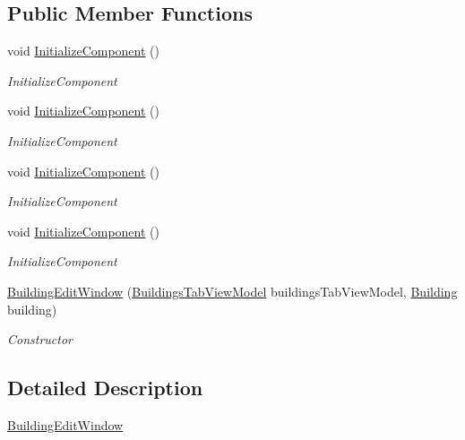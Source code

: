 \subsection*{Public Member Functions}
\begin{DoxyCompactItemize}
\item 
void \hyperlink{class_baudi_1_1_client_1_1_view_1_1_edit_windows_1_1_building_edit_window_a2564e64d22b3990aad94b38d5792df70}{Initialize\+Component} ()
\begin{DoxyCompactList}\small\item\em Initialize\+Component \end{DoxyCompactList}\item 
void \hyperlink{class_baudi_1_1_client_1_1_view_1_1_edit_windows_1_1_building_edit_window_a2564e64d22b3990aad94b38d5792df70}{Initialize\+Component} ()
\begin{DoxyCompactList}\small\item\em Initialize\+Component \end{DoxyCompactList}\item 
void \hyperlink{class_baudi_1_1_client_1_1_view_1_1_edit_windows_1_1_building_edit_window_a2564e64d22b3990aad94b38d5792df70}{Initialize\+Component} ()
\begin{DoxyCompactList}\small\item\em Initialize\+Component \end{DoxyCompactList}\item 
void \hyperlink{class_baudi_1_1_client_1_1_view_1_1_edit_windows_1_1_building_edit_window_a2564e64d22b3990aad94b38d5792df70}{Initialize\+Component} ()
\begin{DoxyCompactList}\small\item\em Initialize\+Component \end{DoxyCompactList}\item 
\hyperlink{class_baudi_1_1_client_1_1_view_1_1_edit_windows_1_1_building_edit_window_aadc21cdda0dd66fddc4f7d248e21fb26}{Building\+Edit\+Window} (\hyperlink{class_baudi_1_1_client_1_1_view_models_1_1_tabs_view_models_1_1_buildings_tab_view_model}{Buildings\+Tab\+View\+Model} buildings\+Tab\+View\+Model, \hyperlink{class_baudi_1_1_d_a_l_1_1_models_1_1_building}{Building} building)
\begin{DoxyCompactList}\small\item\em Constructor \end{DoxyCompactList}\end{DoxyCompactItemize}


\subsection{Detailed Description}
\hyperlink{class_baudi_1_1_client_1_1_view_1_1_edit_windows_1_1_building_edit_window}{Building\+Edit\+Window} 




